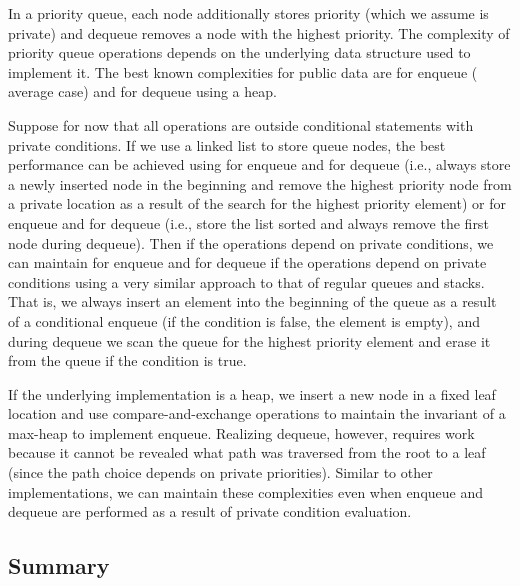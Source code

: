 \documentclass[11pt]{article}
\begin{document}
In a priority queue, each node additionally stores priority (which we assume
is private) and dequeue removes a node with the highest priority. The
complexity of priority queue operations depends on the underlying data
structure used to implement it. The best known complexities for public data
are  for enqueue ( average case) and  for
dequeue using a heap.

Suppose for now that all operations are outside conditional statements with
private conditions. If we use a linked list to store queue nodes, the best
performance can be achieved using  for enqueue and  for dequeue
(i.e., always store a newly inserted node in the beginning and remove the
highest priority node from a private location as a result of the search for
the highest priority element) or  for enqueue and  for dequeue
(i.e., store the list sorted and always remove the first node during
dequeue). Then if the operations depend on private conditions, we can
maintain  for enqueue and  for dequeue if the operations depend
on private conditions using a very similar approach to that of regular
queues and stacks. That is, we always insert an element into the beginning
of the queue as a result of a conditional enqueue (if the condition is
false, the element is empty), and during dequeue we scan the queue for the
highest priority element and erase it from the queue if the condition is
true.

If the underlying implementation is a heap, we insert a new node in a fixed
leaf location and use  compare-and-exchange operations to
maintain the invariant of a max-heap to implement enqueue. Realizing
dequeue, however, requires  work because it cannot be revealed what
path was traversed from the root to a leaf (since the path choice depends on
private priorities). Similar to other implementations, we can maintain these
complexities even when enqueue and dequeue are performed as a result of
private condition evaluation.

\subsection{Summary}
\end{document}
